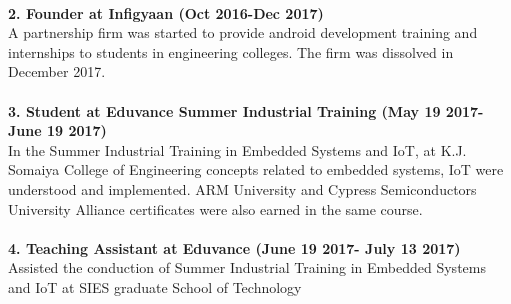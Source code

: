 \documentclass[letterpaper,11pt]{article}
\begin{document}
\textbf{}  \\
\textbf{2. Founder at Infigyaan (Oct 2016-Dec 2017)} \\
A partnership firm was started to provide android development training and internships to students in engineering colleges. The firm was dissolved in December 2017.
\textbf{}  \\
\textbf{}  \\
\textbf{3. Student at Eduvance Summer Industrial Training (May 19 2017- June 19 2017)} \\
In the Summer Industrial Training in Embedded Systems and IoT, at K.J. Somaiya College of Engineering concepts related to embedded systems, IoT were understood and implemented. ARM University and Cypress Semiconductors University Alliance certificates were also earned in the same course.
\textbf{}  \\
\textbf{}  \\
\textbf{4. Teaching Assistant at Eduvance (June 19 2017- July 13 2017)} \\
Assisted the conduction of Summer Industrial Training in Embedded Systems and IoT at SIES graduate School of Technology \\
\textbf{} 
\end{document}
